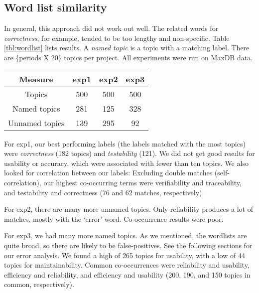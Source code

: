 \documentclass{acm_proc_article-sp}
\begin{document}
\subsection{Word list similarity}


In general, this approach did not work out well. The related words for \emph{correctness}, for example, tended to be too lengthy and non-specific. Table \ref{tbl:wordlist} lists results. A \emph{named   topic} is a topic with a matching label. There are \{periods X 20\} topics per project. All experiments were run on MaxDB data.

\begin{table*}[h]
	\caption{Automatic topic labeling}
	\centering
	\label{tbl:wordlist}
\begin{tabular}{c|c|c|c}
\toprule
Measure &		 \textsf{exp1} &	 \textsf{exp2} &	 \textsf{exp3} \\
\midrule
Topics &			500		 &			500  	 & 		500  \\
Named topics &		281      &			125      &		328  \\
Unnamed topics &	139      &			295      &      92   \\
\bottomrule
\end{tabular}
\end{table*}


For \textsf{exp1}, our best performing labels (the labels matched with the most topics) were \emph{correctness} (182 topics) and \emph{testability} (121). We did not get good results for usability or accuracy, which were associated with fewer than ten topics. We also looked for correlation between our labels: Excluding double matches (self-correlation), our highest co-occurring terms were verifiability and traceability, and testability and correctness (76 and 62 matches, respectively).

For \textsf{exp2}, there are many more unnamed topics. Only reliability produces a lot of matches, mostly with the `error' word. Co-occurrence results were poor.

For \textsf{exp3}, we had many more named topics. As we mentioned, the wordlists are quite broad, so there are likely to be false-positives. See the following sections for our error analysis. We found a high of 265 topics for usability, with a low of 44 topics for maintainability. Common co-occurrences were reliability and usability, efficiency and reliability, and efficiency and usability (200, 190, and 150 topics in common, respectively). 
\end{document}
